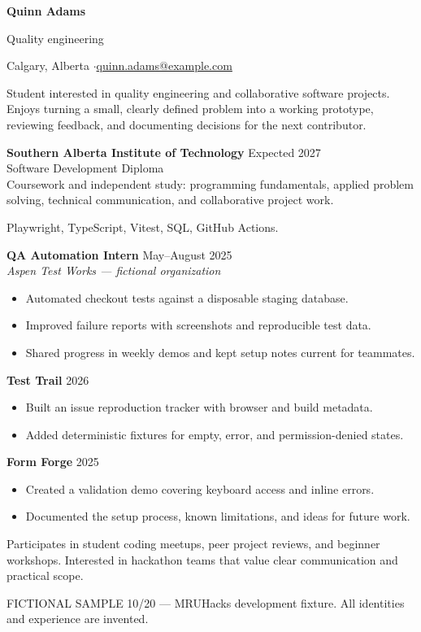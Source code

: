 
{\Huge\bfseries Quinn Adams}\par
{\large\color{accent} Quality engineering}\par
Calgary, Alberta \enspace$\cdot$\enspace \href{mailto:quinn.adams@example.com}{quinn.adams@example.com}

Student interested in quality engineering and collaborative software projects.
Enjoys turning a small, clearly defined problem into a working prototype,
reviewing feedback, and documenting decisions for the next contributor.

\textbf{Southern Alberta Institute of Technology} \hfill Expected 2027\\
Software Development Diploma\\
Coursework and independent study: programming fundamentals, applied problem solving,
technical communication, and collaborative project work.

Playwright, TypeScript, Vitest, SQL, GitHub Actions.

\textbf{QA Automation Intern} \hfill May--August 2025\\
\textit{Aspen Test Works --- fictional organization}
\begin{itemize}
\item Automated checkout tests against a disposable staging database.
\item Improved failure reports with screenshots and reproducible test data.
\item Shared progress in weekly demos and kept setup notes current for teammates.
\end{itemize}

\textbf{Test Trail} \hfill 2026
\begin{itemize}
\item Built an issue reproduction tracker with browser and build metadata.
\item Added deterministic fixtures for empty, error, and permission-denied states.
\end{itemize}
\textbf{Form Forge} \hfill 2025
\begin{itemize}
\item Created a validation demo covering keyboard access and inline errors.
\item Documented the setup process, known limitations, and ideas for future work.
\end{itemize}

Participates in student coding meetups, peer project reviews, and beginner workshops.
Interested in hackathon teams that value clear communication and practical scope.

\vfill
{\footnotesize\color{gray} FICTIONAL SAMPLE 10/20 --- MRUHacks development fixture.
All identities and experience are invented.}

